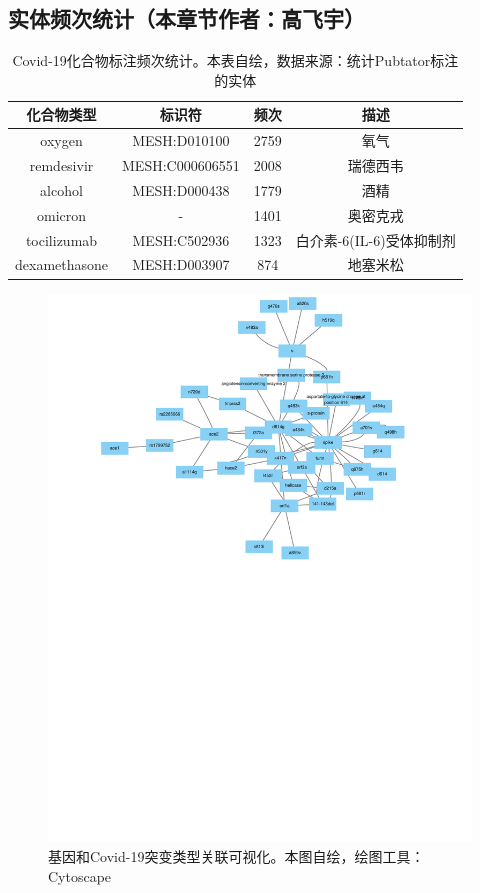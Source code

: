 \documentclass[twocolumn]{article}
\begin{document}
\subsection{实体频次统计（本章节作者：高飞宇）\label{chap:entity_count}}

\begin{table}[ht!]
	\centering
	\caption{Covid-19化合物标注频次统计。本表自绘，数据来源：统计Pubtator标注的实体}
	\begin{tabular}{cccc}
		\hline
		化合物类型 & 标识符 & 频次 & 描述\\
		\hline
		oxygen & MESH:D010100 & 2759 & 氧气\\
		remdesivir & MESH:C000606551 & 2008 & 瑞德西韦\\
		alcohol & MESH:D000438 & 1779 & 酒精\\
		omicron & - & 1401 & 奥密克戎\\
		tocilizumab & MESH:C502936 & 1323 & 白介素-6(IL-6)受体抑制剂\\
		dexamethasone & MESH:D003907 & 874 & 地塞米松\\
		\hline
	\end{tabular}
	\label{tab:mutation}
\end{table}

\begin{figure}[ht!]
	\centering
	\includegraphics{figure/gene_mutation_visualization.pdf}
	\caption{基因和Covid-19突变类型关联可视化。本图自绘，绘图工具：Cytoscape}
	\label{fig:cosentence}
\end{figure}
\end{document}
